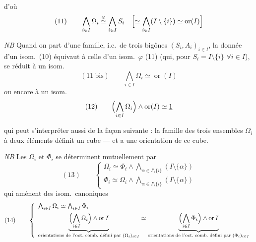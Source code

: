 \documentclass[11pt,a4paper]{article}
\begin{document}
d'où
\[
(11) \qquad \bigwedge_{i \in I} \Omega_i \overset{\varphi}{\simeq} \bigwedge_{i \in I} S_i
\quad \Bigl[\simeq \bigwedge_{i \in I} (I \setminus \lbrace i \rbrace) \simeq \operatorname{or}(I)\Bigr]
\]

\emph{NB} Quand on part d'une famille, i.e.\ de trois bigônes $(S_i, A_i)_{i \in I}$, la donnée d'un isom.\ (10) équivaut à celle d'un isom.\ $\varphi$ (11) (qui, pour $S_i = I \setminus \lbrace i \rbrace$ $\forall i \in I$), se réduit à un isom.
\[
(11\ \text{bis}) \qquad \bigwedge_{i \in I} \Omega_i \simeq \operatorname{or}(I)
\]
ou encore à un isom.
\[
(12) \qquad \Bigl(\bigwedge_{i \in I} \Omega_i\Bigr) \wedge \operatorname{or}(I) \simeq \underline{1}
\]

qui peut s'interpréter aussi de la façon suivante : la famille  des trois ensembles $\Omega_i$ à deux éléments définit un cube --- et  a une orientation de ce cube.

\emph{NB} Les $\Omega_i$ et $\Phi_i$ se déterminent mutuellement par
\[
(13) \qquad
\left\lbrace
\begin{array}{l}
\Omega_i \simeq \Phi_i \wedge \bigwedge_{\alpha \in I \setminus \lbrace i \rbrace} (I \setminus \lbrace \alpha \rbrace) \\[1ex]
\Phi_i \simeq \Omega_i \wedge \bigwedge_{\alpha \in I \setminus \lbrace i \rbrace} (I \setminus \lbrace \alpha \rbrace)
\end{array}
\right.
\]
qui amènent des isom.\ canoniques
\[
(14) \qquad
\left\lbrace
\begin{array}{l}
\bigwedge_{i \in I} \Omega_i \simeq \bigwedge_{i \in I} \Phi_i \\[1ex]
\underbrace{\Bigl(\bigwedge_{i \in I} \Omega_i\Bigr) \wedge \operatorname{or} I}_{\text{orientations de l'oct.\ comb.\ défini par } (\Omega_i)_{i \in I}}
\simeq
\underbrace{\Bigl(\bigwedge_{i \in I} \Phi_i\Bigr) \wedge \operatorname{or} I}_{\text{orientations de l'oct.\ comb.\ défini par } (\Phi_i)_{i \in I}}
\end{array}
\right.
\]
\end{document}
